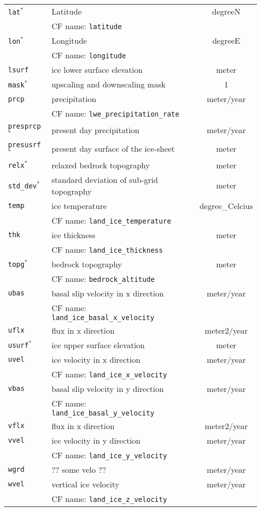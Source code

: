 \begin{center}
\begin{supertabular}{|l|p{8cm}|c|}
\hline
\texttt{lat}$^\ast$ & Latitude & degreeN\\
&CF name: \texttt{latitude}&\\
\hline
\texttt{lon}$^\ast$ & Longitude & degreeE\\
&CF name: \texttt{longitude}&\\
\hline
\texttt{lsurf} & ice lower surface elevation & meter\\
\hline
\texttt{mask}$^\ast$ & upscaling and downscaling mask & 1\\
\hline
\texttt{prcp} & precipitation & meter/year\\
&CF name: \texttt{lwe\_precipitation\_rate}&\\
\hline
\texttt{presprcp}$^\ast$ & present day precipitation & meter/year\\
\hline
\texttt{presusrf}$^\ast$ & present day surface of the ice-sheet & meter\\
\hline
\texttt{relx}$^\ast$ & relaxed bedrock topography & meter\\
\hline
\texttt{std\_dev}$^\ast$ & standard deviation of sub-grid topography & meter\\
\hline
\texttt{temp} & ice temperature & degree\_Celcius\\
&CF name: \texttt{land\_ice\_temperature}&\\
\hline
\texttt{thk} & ice thickness & meter\\
&CF name: \texttt{land\_ice\_thickness}&\\
\hline
\texttt{topg}$^\ast$ & bedrock topography & meter\\
&CF name: \texttt{bedrock\_altitude}&\\
\hline
\texttt{ubas} & basal slip velocity in x direction & meter/year\\
&CF name: \texttt{land\_ice\_basal\_x\_velocity}&\\
\hline
\texttt{uflx} & flux in x direction & meter2/year\\
\hline
\texttt{usurf}$^\ast$ & ice upper surface elevation & meter\\
\hline
\texttt{uvel} & ice velocity in x direction & meter/year\\
&CF name: \texttt{land\_ice\_x\_velocity}&\\
\hline
\texttt{vbas} & basal slip velocity in y direction & meter/year\\
&CF name: \texttt{land\_ice\_basal\_y\_velocity}&\\
\hline
\texttt{vflx} & flux in x direction & meter2/year\\
\hline
\texttt{vvel} & ice velocity in y direction & meter/year\\
&CF name: \texttt{land\_ice\_y\_velocity}&\\
\hline
\texttt{wgrd} & ?? some velo ?? & meter/year\\
\hline
\texttt{wvel} & vertical ice velocity & meter/year\\
&CF name: \texttt{land\_ice\_z\_velocity}&\\
\hline
  \end{supertabular}
\end{center}
